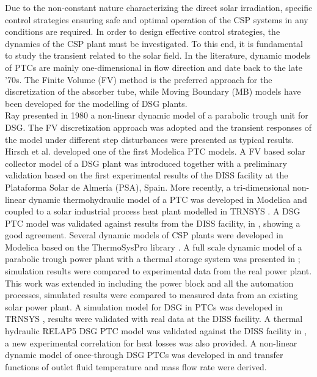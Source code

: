 \documentclass[final,3p,times,review]{elsarticle}
\begin{document}
Due to the non-constant nature characterizing the direct solar irradiation, specific control strategies ensuring safe and optimal operation of the CSP systems in any conditions are required. In order to design effective control strategies, the dynamics  of the CSP plant must be investigated.
To this end,  it is fundamental to study the transient related to the solar field. In the literature,  dynamic models of PTCs are mainly one-dimensional in flow direction and date back to the late ’70s. The Finite Volume (FV) method is the preferred approach for the discretization of the absorber tube, while Moving Boundary (MB) models  have been developed for the modelling of DSG plants.\\

Ray \cite{Ray1981} presented in 1980 a non-linear dynamic model of a parabolic trough unit for DSG. The FV discretization approach was adopted and the transient responses of the model under different step disturbances were presented as typical results. Hirsch et al. \cite{Hirsch2005,Eck2007} developed one of the first Modelica PTC models.  A FV based solar collector model of a DSG plant was introduced together with a preliminary validation based on the first experimental results of the DISS facility at the Plataforma Solar de Almer\'ia (PSA), Spain. More recently, a tri-dimensional non-linear dynamic thermohydraulic model of a PTC was developed in Modelica and coupled to a solar industrial process heat plant modelled in TRNSYS \citep{Silva2013}. A DSG PTC model was validated against results from the DISS facility, in \cite{Lobon2014}, showing a good agreement. Several dynamic models of CSP plants were developed in Modelica based on the ThermoSysPro library \citep{Hefni2014}.  A full scale dynamic model of a parabolic trough power plant with a thermal storage system was presented in \cite{Almaliki2016_1}; simulation results were compared to experimental data from the real power plant.
This work was extended in \cite{Almaliki2016_2} including the power block and all the automation processes, simulated results were compared to measured data from an existing solar power plant. A simulation model for DSG in PTCs was developed in TRNSYS \cite{Biencinto2016}, results were validated with real data at the DISS facility. A thermal hydraulic RELAP5 DSG PTC model was validated against the DISS facility in \cite{Serrano2017}, a new experimental correlation for heat losses was also provided. A non-linear dynamic model of once-through DSG PTCs was developed in \citep{Guo2017} and transfer functions of outlet fluid temperature and mass flow rate were derived.\\
\end{document}
